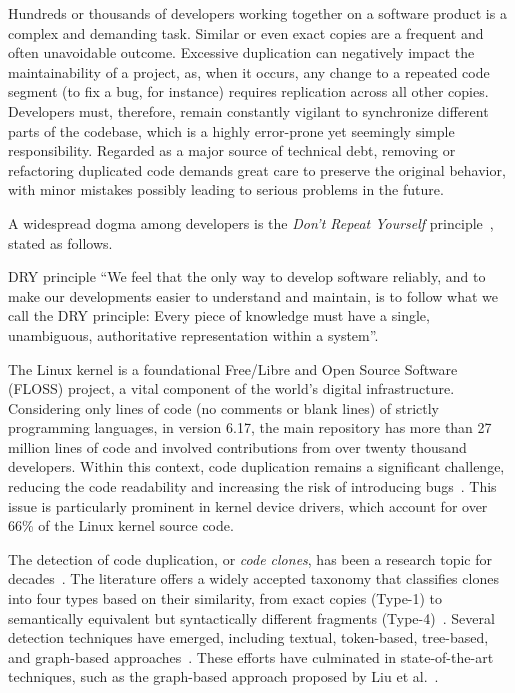 \documentclass[sigconf]{acmart}
\newenvironment{highlight-box}[1]{%
  \begin{framed}%
  \noindent\textbf{#1:} \itshape\ignorespaces}{%
  \end{framed}}
\begin{document}
Hundreds or thousands of developers working together on a software product is a complex and demanding task. Similar or even exact copies are a frequent and often unavoidable outcome. Excessive duplication can negatively impact the maintainability of a project, as, when it occurs, any change to a repeated code segment (to fix a bug, for instance) requires replication across all other copies. Developers must, therefore, remain constantly vigilant to synchronize different parts of the codebase, which is a highly error-prone yet seemingly simple responsibility. Regarded as a major source of technical debt, removing or refactoring duplicated code demands great care to preserve the original behavior, with minor mistakes possibly leading to serious problems in the future.

A widespread dogma among developers is the \textit{Don't Repeat Yourself} principle~\cite{pragmatic-programmer}, stated as follows.

\begin{highlight-box}{DRY principle}
  ``We feel that the only way to develop software reliably, and to make our
  developments easier to understand and maintain, is to follow what we call the
  DRY principle: Every piece of knowledge must have a single, unambiguous,
  authoritative representation within a system''.
\end{highlight-box}

The Linux kernel is a foundational Free/Libre and Open Source Software (FLOSS) project, a vital component of the world's digital infrastructure. Considering only lines of code (no comments or blank lines) of strictly programming languages, in version 6.17, the main repository has more than 27 million lines of code and involved contributions from over twenty thousand developers. Within this context, code duplication remains a significant challenge,  reducing the code readability and increasing the risk of introducing bugs~\cite{harmone,harmtwo}. This issue is particularly prominent in kernel device drivers, which account for over 66\% of the Linux kernel source code.

The detection of code duplication, or \textit{code clones}, has been a research topic for decades~\cite{firstman}. The literature offers a widely accepted taxonomy that classifies clones into four types based on their similarity, from exact copies (Type-1) to semantically equivalent but syntactically different fragments (Type-4)~\cite{litreview}. Several detection techniques have emerged, including textual, token-based, tree-based, and graph-based approaches~\cite{litreview}. These efforts have culminated in state-of-the-art techniques, such as the graph-based approach proposed by Liu et al.~\cite{tailor}.
\end{document}
